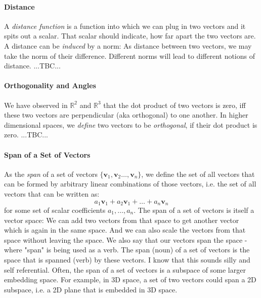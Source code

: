 \paragraph{Distance}
A \emph{distance function} is a function into which we can plug in two vectors and it spits out a scalar. That scalar should indicate, how far apart the two vectors are. A distance can be \emph{induced} by a norm: As distance between two vectors, we may take the norm of their difference. Different norms will lead to different notions of distance. ...TBC...




\paragraph{Orthogonality and Angles}
We have observed in $\mathbb{R}^2$ and $\mathbb{R}^3$ that the dot product of two vectors is zero, iff these two vectors are perpendicular (aka orthogonal) to one another. In higher dimensional spaces, we \emph{define} two vectors to be \emph{orthogonal}, if their dot product is zero. ...TBC...

% 



\paragraph{Span of a Set of Vectors}
As the \emph{span} of a set of vectors $\{\mathbf{v}_1, \mathbf{v}_2 \ldots, \mathbf{v}_n \}$, we define the set of all vectors that can be formed by arbitrary linear combinations of those vectors, i.e. the set of all vectors that can be written as:
\begin{equation}
 a_1 \mathbf{v}_1 + a_2 \mathbf{v}_1  + \ldots + a_n \mathbf{v}_n 
\end{equation}
for some set of scalar coefficients $a_1, \ldots, a_n$. The span of a set of vectors is itself a vector space: We can add two vectors from that space to get another vector which is again in the same space. And we can also scale the vectors from that space without leaving the space. We also say that our vectors span the space - where "span" is being used as a verb. The span (noun) of a set of vectors is the space that is spanned (verb) by these vectors. I know that this sounds silly and self referential. Often, the span of a set of vectors is a subspace of some larger embedding space. For example, in 3D space, a set of two vectors could span a 2D subspace, i.e. a 2D plane that is embedded in 3D space.



